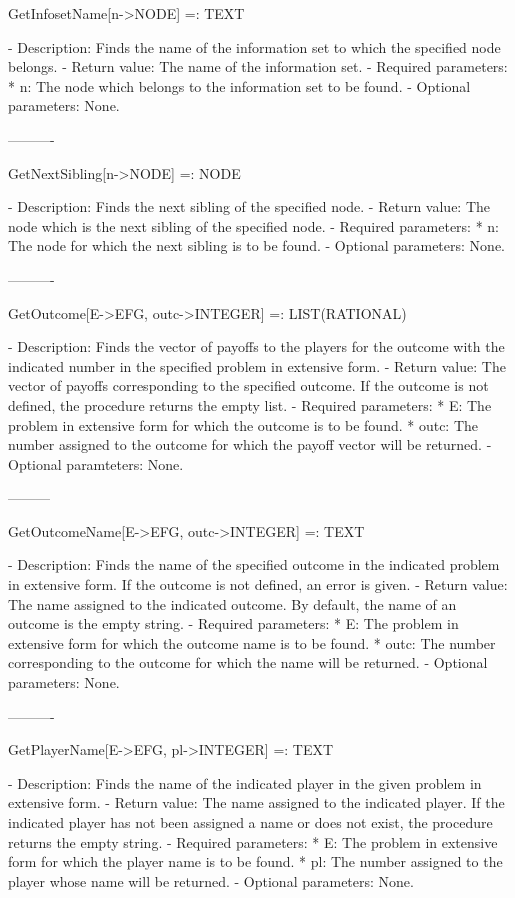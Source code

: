 {GetInfosetName[n->NODE] =: TEXT

   -	Description:  Finds the name of the information set to which the 
	specified node belongs.
   -	Return value:  The name of the information set.
   -	Required parameters:
	  *  n:  The node which belongs to the information set to be found.
   -	Optional parameters:  None.

----------

GetNextSibling[n->NODE] =: NODE

   -	Description:  Finds the next sibling of the specified node.
   -	Return value:  The node which is the next sibling of the specified 
	node.
   -	Required parameters:
	  *  n:  The node for which the next sibling is to be found.
   -	Optional parameters:  None.

----------

GetOutcome[E->EFG, outc->INTEGER] =: LIST(RATIONAL)

   -	Description:  Finds the vector of payoffs to the players for the 
	outcome with the indicated number in the specified problem in extensive
	form.
   -	Return value:  The vector of payoffs corresponding to the specified 
	outcome.  If the outcome is not defined, the procedure returns the 
	empty list.
   -	Required parameters:
	  *  E:  The problem in extensive form for which the outcome is to be
		found.
	  *  outc:  The number assigned to the outcome for which the payoff 
		vector will be returned.
   -	Optional paramteters:  None.

---------

GetOutcomeName[E->EFG, outc->INTEGER] =: TEXT

   -	Description:  Finds the name of the specified outcome in the indicated
	problem in extensive form.  If the outcome is not defined, an error is
	given.
   -	Return value:  The name assigned to the indicated outcome.  By default,
	the name of an outcome is the empty string.
   -	Required parameters:
	  *  E:  The problem in extensive form for which the outcome name is to
		be found.
	  *  outc:  The number corresponding to the outcome for which the name 
		will be returned.
   -	Optional parameters:  None.

----------

GetPlayerName[E->EFG, pl->INTEGER] =: TEXT

   -	Description:  Finds the name of the indicated player in the given 
	problem in extensive form.
   -	Return value:  The name assigned to the indicated player.  If the 
	indicated player has not been assigned a name or does not exist, the
	procedure returns the empty string.
   -	Required parameters:
	  *  E:  The problem in extensive form for which the player name is to
		be found.
	  *  pl:  The number assigned to the player whose name will be 
		returned.
   -	Optional parameters:  None.

}
